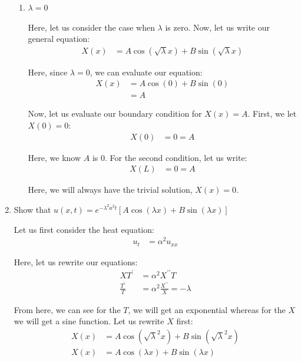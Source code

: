 \documentclass{article}
\begin{document}
\begin{enumerate}
\begin{enumerate}
  \item $\lambda = 0$

  Here, let us consider the case when $\lambda$ is zero. Now, let us write our general equation:
  \begin{align}
    X(x) & = A \cos(\sqrt \lambda x) + B \sin(\sqrt \lambda x)
  \end{align}

  Here, since $\lambda = 0$, we can evaluate our equation:
  \begin{align}
    X(x) & = A \cos(0) + B \sin(0)\\
    & = A
  \end{align}

  Now, let us evaluate our boundary condition for $X(x) = A$. First, we let $X(0) = 0$:
  \begin{align}
    X(0) & = 0 = A
  \end{align}

  Here, we know $A$ is $0$. For the second condition, let us write:
  \begin{align}
    X(L) & = 0 = A
  \end{align}

  Here, we will always have the trivial solution, $X(x) = 0$.

\end{enumerate}
%
%
\newpage
\setcounter{equation}{0}
%
%
  \item Show that $u(x, t) = e^{-\lambda^2 a^2 t}\left[ A \cos(\lambda x) + B \sin(\lambda x) \right]$




%


Let us first consider the heat equation:
%
\begin{align}
  u_t & = \alpha^2 u_{xx}
\end{align}

Here, let us rewrite our equations:
%
\begin{align}
  XT^\prime & = \alpha^2 X^{\prime\prime}T\\
  \frac{T^\prime}{T} & = \alpha^2 \frac{X^{\prime\prime}}{X} = -\lambda
\end{align}

From here, we can see for the $T$, we will get an exponential whereas for the $X$ we will get a sine function. Let us rewrite $X$ first:
%
\begin{align}
  X(x) & = A \cos(\sqrt \lambda^2 x) + B \sin(\sqrt \lambda^2 x)\\
  X(x) & = A \cos(\lambda x) + B \sin(\lambda x)
\end{align}


\end{enumerate}
\end{document}
